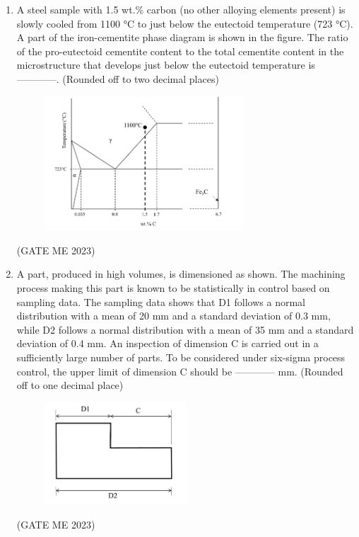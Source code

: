 \documentclass[journal]{IEEEtran}
\begin{document}
\begin{enumerate}
(Answer in integer)
\hfill (GATE ME 2023)

\item A steel sample with 1.5 wt.\% carbon (no other alloying elements present) is slowly cooled from 1100 °C to just below the eutectoid temperature (723 °C). A part of the iron-cementite phase diagram is shown in the figure. The ratio of the pro-eutectoid cementite content to the total cementite content in the microstructure that develops just below the eutectoid temperature is ------------. (Rounded off to two decimal places)
\begin{figure}[H]
\centering
\includegraphics[width=0.7\textwidth]{Fig 46.png}
\caption{}
\label{fig:question52}
\end{figure}
\hfill (GATE ME 2023)

\item A part, produced in high volumes, is dimensioned as shown. The machining process making this part is known to be statistically in control based on sampling data. The sampling data shows that D1 follows a normal distribution with a mean of 20 mm and a standard deviation of 0.3 mm, while D2 follows a normal distribution with a mean of 35 mm and a standard deviation of 0.4 mm. An inspection of dimension C is carried out in a sufficiently large number of parts. To be considered under six-sigma process control, the upper limit of dimension C should be ------------ mm. (Rounded off to one decimal place)
\begin{figure}[H]
\centering
\includegraphics[width=0.5\textwidth]{Fig 47.png}
\caption{}
\label{fig:question53}
\end{figure}
\hfill (GATE ME 2023)


\end{enumerate}
\end{document}

